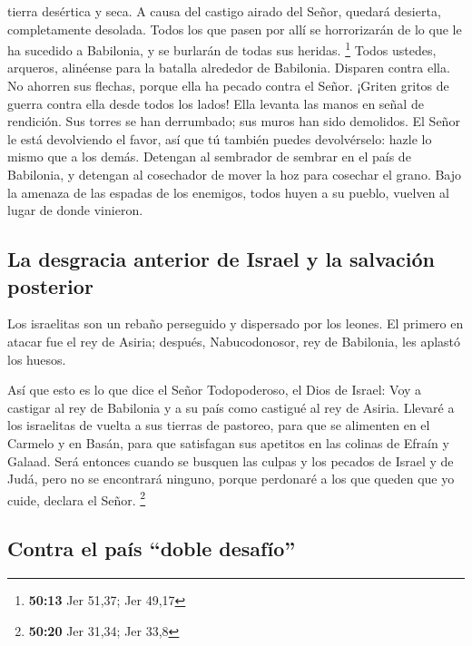 tierra desértica y seca.  A causa del castigo airado del
Señor, quedará desierta, completamente desolada. Todos los que pasen por
allí se horrorizarán de lo que le ha sucedido a Babilonia, y se burlarán
de todas sus heridas. \footnote{\textbf{50:13} Jer 51,37; Jer 49,17}
 Todos ustedes, arqueros, alinéense para la batalla
alrededor de Babilonia. Disparen contra ella. No ahorren sus flechas,
porque ella ha pecado contra el Señor.  ¡Griten gritos de
guerra contra ella desde todos los lados! Ella levanta las manos en
señal de rendición. Sus torres se han derrumbado; sus muros han sido
demolidos. El Señor le está devolviendo el favor, así que tú también
puedes devolvérselo: hazle lo mismo que a los demás. 
Detengan al sembrador de sembrar en el país de Babilonia, y detengan al
cosechador de mover la hoz para cosechar el grano. Bajo la amenaza de
las espadas de los enemigos, todos huyen a su pueblo, vuelven al lugar
de donde vinieron.

\hypertarget{la-desgracia-anterior-de-israel-y-la-salvaciuxf3n-posterior}{%
\subsection{La desgracia anterior de Israel y la salvación
posterior}\label{la-desgracia-anterior-de-israel-y-la-salvaciuxf3n-posterior}}

 Los israelitas son un rebaño perseguido y dispersado por
los leones. El primero en atacar fue el rey de Asiria; después,
Nabucodonosor, rey de Babilonia, les aplastó los huesos.

 Así que esto es lo que dice el Señor Todopoderoso, el
Dios de Israel: Voy a castigar al rey de Babilonia y a su país como
castigué al rey de Asiria.  Llevaré a los israelitas de
vuelta a sus tierras de pastoreo, para que se alimenten en el Carmelo y
en Basán, para que satisfagan sus apetitos en las colinas de Efraín y
Galaad.  Será entonces cuando se busquen las culpas y los
pecados de Israel y de Judá, pero no se encontrará ninguno, porque
perdonaré a los que queden que yo cuide, declara el Señor. \footnote{\textbf{50:20}
  Jer 31,34; Jer 33,8}

\hypertarget{contra-el-pauxeds-doble-desafuxedo}{%
\subsection{Contra el país ``doble
desafío''}\label{contra-el-pauxeds-doble-desafuxedo}}

